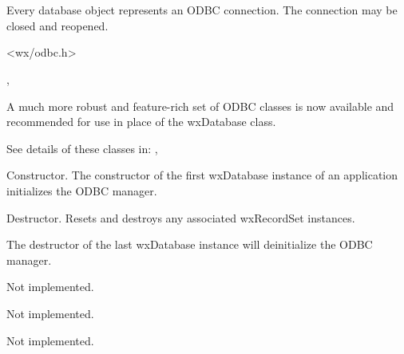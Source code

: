\section{}\label{wxdatabase}

Every database object represents an ODBC connection.
The connection may be closed and reopened.




<wx/odbc.h>


, 

A much more robust and feature-rich set of ODBC classes is now
available and recommended for use in place of the wxDatabase class.

See details of these classes in:
, 




Constructor. The constructor of the first wxDatabase instance of an
application initializes the ODBC manager.



Destructor. Resets and destroys any associated wxRecordSet instances.

The destructor of the last wxDatabase instance will deinitialize
the ODBC manager.



Not implemented.



Not implemented.



Not implemented.



